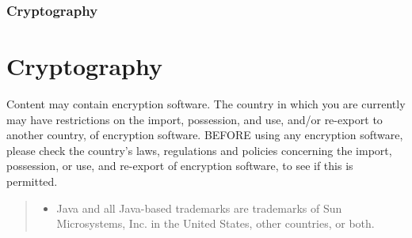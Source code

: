   \subsubsection{Cryptography}
  \label{sec:cryptography}
  \else
  \section{Cryptography}
  \label{sec:cryptography}
  \fi
\fi

Content may contain encryption software. The country in which you are currently may have restrictions on the import, possession, and use, and/or re-export to another country, of encryption software. BEFORE using any encryption software, please check the country's laws, regulations and policies concerning the import, possession, or use, and re-export of encryption software, to see if this is permitted.

\begin{quote}
  \footnotesize

  \begin{itemize}
  \item  Java and all Java-based trademarks are trademarks of Sun
    Microsystems, Inc. in the United States, other countries, or
    both.
  \end{itemize}
\end{quote}

